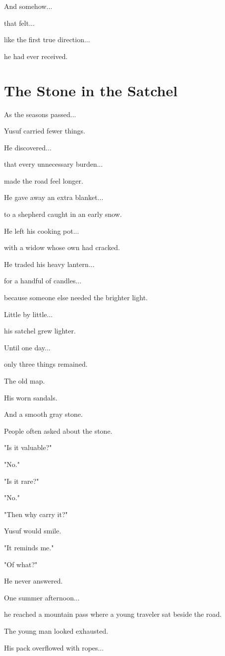 \documentclass[12pt,openany]{book}
\begin{document}
And somehow...

that felt...

like the first true direction...

he had ever received.
\section*{The Stone in the Satchel}

As the seasons passed...

Yusuf carried fewer things.

He discovered...

that every unnecessary burden...

made the road feel longer.

He gave away an extra blanket...

to a shepherd caught in an early snow.

He left his cooking pot...

with a widow whose own had cracked.

He traded his heavy lantern...

for a handful of candles...

because someone else needed the brighter light.

Little by little...

his satchel grew lighter.

Until one day...

only three things remained.

The old map.

His worn sandals.

And a smooth gray stone.

People often asked about the stone.

"Is it valuable?"

"No."

"Is it rare?"

"No."

"Then why carry it?"

Yusuf would smile.

"It reminds me."

"Of what?"

He never answered.

One summer afternoon...

he reached a mountain pass where a young traveler sat beside the road.

The young man looked exhausted.

His pack overflowed with ropes...
\end{document}

